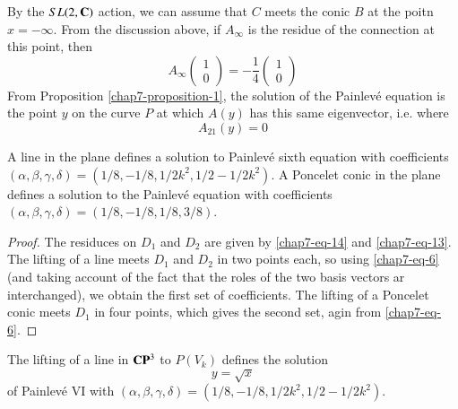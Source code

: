 \begin{remark*}
By the $SL(2, \mathbf{C})$ action, we can assume that $C$ meets the conic $B$ at the poitn $x=-\infty$. From the discussion above, if $A_{\infty}$ is the residue of the connection at this point, then
$$
A_{\infty}
\left(
\begin{matrix}
1\\
0
\end{matrix}
\right) 
= -\dfrac{1}{4}
\left(
\begin{matrix}
1\\
0
\end{matrix}
\right) 
$$
From Proposition \ref{chap7-proposition-1}, the solution of the Painlev\'e equation is the point $y$ on the curve $P$ at which $A(y)$ has this same eigenvector, i.e. where
$$
A_{21}(y)=0
$$
\end{remark*}

\begin{proposition}\label{chap7-proposition-5}
A line in the plane defines a solution to Painlev\'e sixth equation with coefficients $(\alpha, \beta, \gamma, \delta) = (1/8, -1/8,1/2k^{2},1/2-1/2k^{2})$. A Poncelet conic in the plane defines a solution to the Painlev\'e equation with coefficients $(\alpha, \beta,\gamma, \delta) = (1/8, -1/8, 1/8, 3/8)$.
\end{proposition}

\begin{proof}
The residuces on $D_{1}$ and $D_{2}$ are given by \eqref{chap7-eq-14} and \eqref{chap7-eq-13}. The lifting of a line meets $D_{1}$ and $D_{2}$ in two points each, so using \eqref{chap7-eq-6} (and taking account of the fact that the roles of the two basis vectors ar interchanged), we obtain the first set of coefficients. The lifting of a Poncelet conic meets $D_{1}$ in  four points, which gives the second set, agin from \eqref{chap7-eq-6}.
\end{proof}

\begin{proposition}\label{chap7-proposition-6}
The lifting of a line in $\mathbf{C}\mathbf{P}^{3}$ to $P(V_{k})$ defines the solution
$$
y = \sqrt{x}
$$
of Painlev\'e VI with $(\alpha, \beta, \gamma, \delta)= (1/8,-1/8, 1/2k^{2},1/2-1/2k^{2})$.
\end{proposition}

